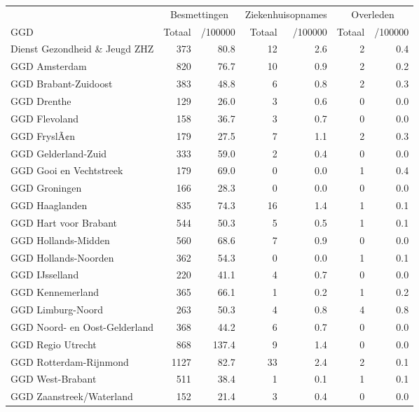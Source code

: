 \documentclass[
  english,
  man,floatsintext]{apa6}
\begin{document}
\begin{table}
\centering\begingroup\fontsize{10}{12}\selectfont

\begin{threeparttable}
\begin{tabular}{lrrrrrr}
\toprule
\multicolumn{1}{c}{ } & \multicolumn{2}{c}{Besmettingen} & \multicolumn{2}{c}{Ziekenhuisopnames} & \multicolumn{2}{c}{Overleden} \\
\cmidrule(l{3pt}r{3pt}){2-3} \cmidrule(l{3pt}r{3pt}){4-5} \cmidrule(l{3pt}r{3pt}){6-7}
GGD & Totaal & /100000 & Totaal & /100000 & Totaal & /100000\\
\midrule
Dienst Gezondheid \& Jeugd ZHZ & 373 & 80.8 & 12 & 2.6 & 2 & 0.4\\
GGD Amsterdam & 820 & 76.7 & 10 & 0.9 & 2 & 0.2\\
GGD Brabant-Zuidoost & 383 & 48.8 & 6 & 0.8 & 2 & 0.3\\
GGD Drenthe & 129 & 26.0 & 3 & 0.6 & 0 & 0.0\\
GGD Flevoland & 158 & 36.7 & 3 & 0.7 & 0 & 0.0\\
GGD FryslÃ¢n & 179 & 27.5 & 7 & 1.1 & 2 & 0.3\\
GGD Gelderland-Zuid & 333 & 59.0 & 2 & 0.4 & 0 & 0.0\\
GGD Gooi en Vechtstreek & 179 & 69.0 & 0 & 0.0 & 1 & 0.4\\
GGD Groningen & 166 & 28.3 & 0 & 0.0 & 0 & 0.0\\
GGD Haaglanden & 835 & 74.3 & 16 & 1.4 & 1 & 0.1\\
GGD Hart voor Brabant & 544 & 50.3 & 5 & 0.5 & 1 & 0.1\\
GGD Hollands-Midden & 560 & 68.6 & 7 & 0.9 & 0 & 0.0\\
GGD Hollands-Noorden & 362 & 54.3 & 0 & 0.0 & 1 & 0.1\\
GGD IJsselland & 220 & 41.1 & 4 & 0.7 & 0 & 0.0\\
GGD Kennemerland & 365 & 66.1 & 1 & 0.2 & 1 & 0.2\\
GGD Limburg-Noord & 263 & 50.3 & 4 & 0.8 & 4 & 0.8\\
GGD Noord- en Oost-Gelderland & 368 & 44.2 & 6 & 0.7 & 0 & 0.0\\
GGD Regio Utrecht & 868 & 137.4 & 9 & 1.4 & 0 & 0.0\\
GGD Rotterdam-Rijnmond & 1127 & 82.7 & 33 & 2.4 & 2 & 0.1\\
GGD West-Brabant & 511 & 38.4 & 1 & 0.1 & 1 & 0.1\\
GGD Zaanstreek/Waterland & 152 & 21.4 & 3 & 0.4 & 0 & 0.0\\

\end{tabular}
\end{threeparttable}
\end{table}
\end{document}
